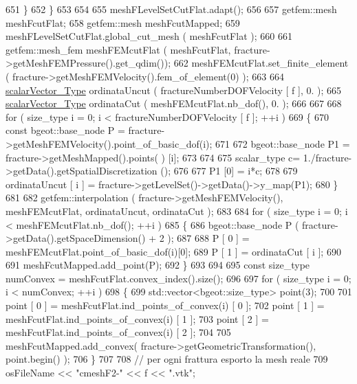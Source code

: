 \begin{DoxyCode}
651             \}
652         \}
653 
654 
655         meshFLevelSetCutFlat.adapt();
656 
657         getfem::mesh meshFcutFlat;
658         getfem::mesh meshFcutMapped;
659         meshFLevelSetCutFlat.global\_cut\_mesh ( meshFcutFlat );
660 
661         getfem::mesh\_fem meshFEMcutFlat ( meshFcutFlat, fracture->getMeshFEMPressure().get\_qdim());
662         meshFEMcutFlat.set\_finite\_element ( fracture->getMeshFEMVelocity().fem\_of\_element(0) );
663 
664         \hyperlink{Core_8h_a4e75b5863535ba1dd79942de2846eff0}{scalarVector\_Type} ordinataUncut ( fractureNumberDOFVelocity [ f ], 0. );
665         \hyperlink{Core_8h_a4e75b5863535ba1dd79942de2846eff0}{scalarVector\_Type} ordinataCut ( meshFEMcutFlat.nb\_dof(), 0. );
666 
667     
668         \textcolor{keywordflow}{for} ( size\_type i = 0; i < fractureNumberDOFVelocity [ f ]; ++i )
669         \{
670             \textcolor{keyword}{const} bgeot::base\_node P = fracture->getMeshFEMVelocity().point\_of\_basic\_dof(i);
671 
672             bgeot::base\_node P1 = fracture->getMeshMapped().points( ) [i];
673 
674 
675             scalar\_type c= 1./fracture->getData().getSpatialDiscretization ();
676 
677             P1 [0] =  i*c;
678 
679             ordinataUncut [ i ] = fracture->getLevelSet()->getData()->y\_map(P1);
680         \}
681 
682         getfem::interpolation ( fracture->getMeshFEMVelocity(), meshFEMcutFlat, ordinataUncut, ordinataCut 
      );
683 
684         \textcolor{keywordflow}{for} ( size\_type i = 0; i < meshFEMcutFlat.nb\_dof(); ++i )
685         \{
686             bgeot::base\_node P ( fracture->getData().getSpaceDimension() + 2 );
687             
688             P [ 0 ] = meshFEMcutFlat.point\_of\_basic\_dof(i)[0];
689             P [ 1 ] = ordinataCut [ i ];
690             
691             meshFcutMapped.add\_point(P);
692         \}
693 
694 
695         \textcolor{keyword}{const} size\_type numConvex = meshFcutFlat.convex\_index().size();
696 
697         \textcolor{keywordflow}{for} ( size\_type i = 0; i < numConvex; ++i )
698         \{
699             std::vector<bgeot::size\_type> point(3);
700            
701             point [ 0 ] = meshFcutFlat.ind\_points\_of\_convex(i) [ 0 ];
702             point [ 1 ] = meshFcutFlat.ind\_points\_of\_convex(i) [ 1 ];
703             point [ 2 ] = meshFcutFlat.ind\_points\_of\_convex(i) [ 2 ];
704             
705             meshFcutMapped.add\_convex( fracture->getGeometricTransformation(), point.begin() );
706         \}
707 
708         \textcolor{comment}{// per ogni frattura esporto la mesh reale}
709         osFileName << \textcolor{stringliteral}{"cmeshF2-"} << f << \textcolor{stringliteral}{".vtk"};

\end{DoxyCode}
